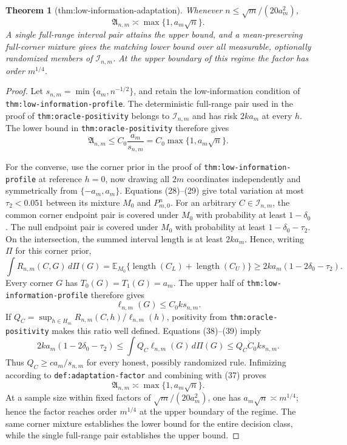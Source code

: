 \documentclass{article}
\newtheorem{theorem}{Theorem}
\begin{document}
\begin{theorem}[thm:low-information-adaptation]\label{thm:low-information-adaptation}
Whenever \(n\le\sqrt m/(20a_m^2)\), \[\mathfrak A_{n,m}\asymp\max\{1,a_m\sqrt n\}.\] A single full-range interval pair attains the upper bound, and a mean-preserving full-corner mixture gives the matching lower bound over all measurable, optionally randomized members of \(\mathcal I_{n,m}\). At the upper boundary of this regime the factor has order \(m^{1/4}\).
\end{theorem}
\begin{proof}
Let \(s_{n,m}=\min\{a_m,n^{-1/2}\}\), and retain the low-information
condition of \texttt{thm:low-information-profile}.  The deterministic
full-range pair used in the proof of \texttt{thm:oracle-positivity} belongs
to \(\mathcal I_{n,m}\) and has risk \(2ka_m\) at every \(h\).  The lower
bound in \texttt{thm:oracle-positivity} therefore gives
\[
 \mathfrak A_{n,m}
 \le C_0\frac{a_m}{s_{n,m}}
 =C_0\max\{1,a_m\sqrt n\}.                                               \tag{37}
\]

For the converse, use the corner prior in the proof of
\texttt{thm:low-information-profile} at reference \(h=0\), now drawing all
\(2m\) coordinates independently and symmetrically from
\(\{-a_m,a_m\}\).  Equations (28)--(29) give total variation at most
\(\tau_2<0.051\) between its mixture \(M_0\) and \(P_{m,0}^n\).  For an
arbitrary \(C\in\mathcal I_{n,m}\), the common corner endpoint pair is
covered under \(M_0\) with probability at least \(1-\delta_0\).  The null
endpoint pair is covered under \(M_0\) with probability at least
\(1-\delta_0-\tau_2\).  On the intersection, the summed interval length is
at least \(2ka_m\).  Hence, writing \(\Pi\) for this corner prior,
\[
 \int R_{n,m}(C,G)\,d\Pi(G)
 =\mathbb E_{M_0}\{\operatorname{length}(C_L)+
                    \operatorname{length}(C_U)\}
 \ge2ka_m(1-2\delta_0-\tau_2).                                          \tag{38}
\]
Every corner \(G\) has \(T_0(G)=T_1(G)=a_m\).  The upper half of
\texttt{thm:low-information-profile} therefore gives
\[
 \ell_{n,m}(G)\le C_0k s_{n,m}.                                         \tag{39}
\]
If
\(Q_C=\sup_{h\in H_m}R_{n,m}(C,h)/\ell_{n,m}(h)\), positivity from
\texttt{thm:oracle-positivity} makes this ratio well defined.  Equations
(38)--(39) imply
\[
 2ka_m(1-2\delta_0-\tau_2)
 \le\int Q_C\ell_{n,m}(G)\,d\Pi(G)
 \le Q_CC_0ks_{n,m}.
\]
Thus \(Q_C\ge c a_m/s_{n,m}\) for every honest, possibly randomized rule.
Infimizing according to \texttt{def:adaptation-factor} and combining with
(37) proves
\[
 \mathfrak A_{n,m}\asymp\max\{1,a_m\sqrt n\}.
\]
At a sample size within fixed factors of
\(\sqrt m/(20a_m^2)\), one has
\(a_m\sqrt n\asymp m^{1/4}\); hence the factor reaches order
\(m^{1/4}\) at the upper boundary of the regime.  The same corner mixture
establishes the lower bound for the entire decision class, while the single
full-range pair establishes the upper bound.
\end{proof}
\end{document}
